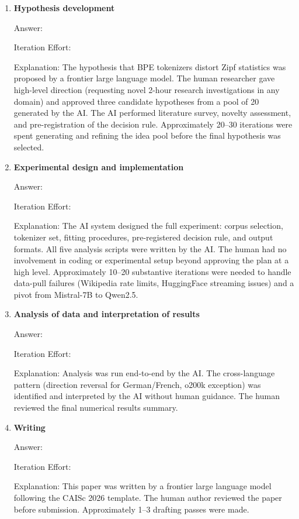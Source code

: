 \documentclass{article}
\begin{document}
\begin{enumerate}

  \item \textbf{Hypothesis development}

    Answer: \involvementD{}

    Iteration Effort: \iterationMedium{}

    Explanation: The hypothesis that BPE tokenizers distort Zipf statistics was proposed
    by a frontier large language model. The human researcher gave high-level direction
    (requesting novel 2-hour research investigations in any domain) and approved three
    candidate hypotheses from a pool of 20 generated by the AI. The AI performed
    literature survey, novelty assessment, and pre-registration of the decision rule.
    Approximately 20--30 iterations were spent generating and refining the idea pool
    before the final hypothesis was selected.

  \item \textbf{Experimental design and implementation}

    Answer: \involvementD{}

    Iteration Effort: \iterationMedium{}

    Explanation: The AI system designed the full experiment: corpus selection, tokenizer
    set, fitting procedures, pre-registered decision rule, and output formats. All five
    analysis scripts were written by the AI. The human had no involvement in coding or
    experimental setup beyond approving the plan at a high level. Approximately 10--20
    substantive iterations were needed to handle data-pull failures (Wikipedia rate
    limits, HuggingFace streaming issues) and a pivot from Mistral-7B to Qwen2.5.

  \item \textbf{Analysis of data and interpretation of results}

    Answer: \involvementD{}

    Iteration Effort: \iterationLow{}

    Explanation: Analysis was run end-to-end by the AI. The cross-language pattern
    (direction reversal for German/French, o200k exception) was identified and
    interpreted by the AI without human guidance. The human reviewed the final numerical
    results summary.

  \item \textbf{Writing}

    Answer: \involvementD{}

    Iteration Effort: \iterationLow{}

    Explanation: This paper was written by a frontier large language model following the
    CAISc 2026 template. The human author reviewed the paper before submission.
    Approximately 1--3 drafting passes were made.

\end{enumerate}
\end{document}

